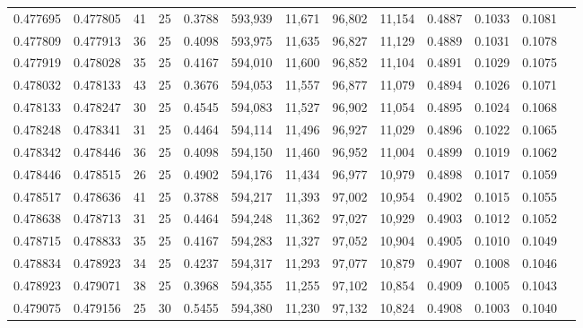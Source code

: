 \begin{tabular}{rrrrrrrrrrrrr}
0.477695 & 0.477805 &    41 &  25 &                                     0.3788 & 593,939 &  11,671 &  96,802 &  11,154 & 0.4887 & 0.1033 & 0.1081 \\
0.477809 & 0.477913 &    36 &  25 &                                     0.4098 & 593,975 &  11,635 &  96,827 &  11,129 & 0.4889 & 0.1031 & 0.1078 \\
0.477919 & 0.478028 &    35 &  25 &                                     0.4167 & 594,010 &  11,600 &  96,852 &  11,104 & 0.4891 & 0.1029 & 0.1075 \\
0.478032 & 0.478133 &    43 &  25 &                                     0.3676 & 594,053 &  11,557 &  96,877 &  11,079 & 0.4894 & 0.1026 & 0.1071 \\
0.478133 & 0.478247 &    30 &  25 &                                     0.4545 & 594,083 &  11,527 &  96,902 &  11,054 & 0.4895 & 0.1024 & 0.1068 \\
0.478248 & 0.478341 &    31 &  25 &                                     0.4464 & 594,114 &  11,496 &  96,927 &  11,029 & 0.4896 & 0.1022 & 0.1065 \\
0.478342 & 0.478446 &    36 &  25 &                                     0.4098 & 594,150 &  11,460 &  96,952 &  11,004 & 0.4899 & 0.1019 & 0.1062 \\
0.478446 & 0.478515 &    26 &  25 &                                     0.4902 & 594,176 &  11,434 &  96,977 &  10,979 & 0.4898 & 0.1017 & 0.1059 \\
0.478517 & 0.478636 &    41 &  25 &                                     0.3788 & 594,217 &  11,393 &  97,002 &  10,954 & 0.4902 & 0.1015 & 0.1055 \\
0.478638 & 0.478713 &    31 &  25 &                                     0.4464 & 594,248 &  11,362 &  97,027 &  10,929 & 0.4903 & 0.1012 & 0.1052 \\
0.478715 & 0.478833 &    35 &  25 &                                     0.4167 & 594,283 &  11,327 &  97,052 &  10,904 & 0.4905 & 0.1010 & 0.1049 \\
0.478834 & 0.478923 &    34 &  25 &                                     0.4237 & 594,317 &  11,293 &  97,077 &  10,879 & 0.4907 & 0.1008 & 0.1046 \\
0.478923 & 0.479071 &    38 &  25 &                                     0.3968 & 594,355 &  11,255 &  97,102 &  10,854 & 0.4909 & 0.1005 & 0.1043 \\
0.479075 & 0.479156 &    25 &  30 &                                     0.5455 & 594,380 &  11,230 &  97,132 &  10,824 & 0.4908 & 0.1003 & 0.1040 \\

\end{tabular}
